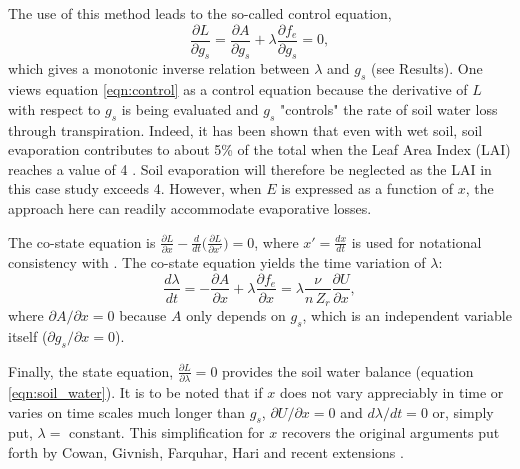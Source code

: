\documentclass[utf8]{frontiersSCNS} %
\begin{document}
The use of this method leads to the so-called control equation,
\begin{equation}
    \label{eqn:control}
    \frac{\partial L}{\partial g_s} = \frac{\partial A}{\partial g_s} + \lambda \frac{\partial f_e}{\partial g_s} = 0,
\end{equation}
which gives a monotonic inverse relation between $\lambda$ and $g_s$ (see Results). One views equation \ref{eqn:control} as a control equation because the derivative of $L$ with respect to $g_s$ is being evaluated and $g_s$ "controls" the rate of soil water loss through transpiration. Indeed, it has been shown that even with wet soil, soil evaporation contributes to about 5\% of the total when the Leaf Area Index (LAI) reaches a value of 4 \citep{wallace1993measurements,herbst1996simultaneous,jones2013plants}. Soil evaporation will therefore be neglected as the LAI in this case study exceeds 4.  However, when $E$ is expressed as a function of $x$, the approach here can readily accommodate evaporative losses.

The co-state equation is $\frac{\partial L}{\partial x} - \frac{d}{dt} \Big(\frac{\partial L}{\partial x'} \Big) = 0$, where $x'= \frac{dx}{dt}$ is used for notational consistency with \citet{witelski_variational_2015}. The co-state equation yields the time variation of $\lambda$:
\begin{equation}
    \label{eqn:co_state}
    \frac{d \lambda}{dt} = - \frac{\partial A}{\partial x} + \lambda \frac{\partial f_e}{\partial x} = \lambda \frac{\nu}{n\, Z_r} \frac{\partial U}{\partial x},
\end{equation}
where $\partial A / \partial x = 0$ because $A$ only depends on $g_s$, which is an independent variable itself ($\partial g_s / \partial x = 0$).

Finally, the state equation, $\frac{\partial L}{\partial \lambda} = 0$ provides the soil water balance (equation \ref{eqn:soil_water}). It is to be noted that if $x$ does not vary appreciably in time or varies on time scales much longer than $g_s$, $\partial U/{\partial x} = 0$ and $d\lambda/dt=0$ or, simply put, $\lambda =$ constant.  This simplification for $x$ recovers the original arguments put forth by Cowan, Givnish, Farquhar, Hari and recent extensions \citep{cowan_stomatal_1977,hari1986optimal,konrad2008modelling,katul_stomatal_2009,medlyn2011reconciling}.

\end{document}
